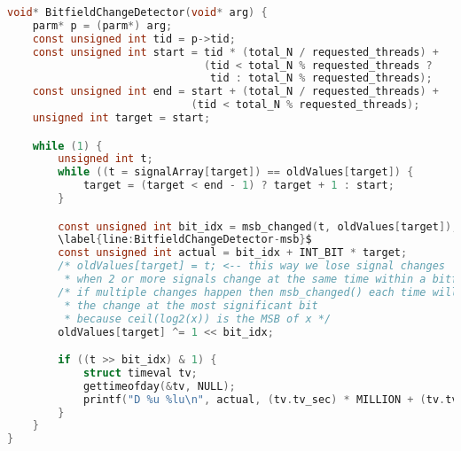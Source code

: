 \begin{lstlisting}[language=c, caption={BitfieldChangeDetector()}, escapechar=$]
void* BitfieldChangeDetector(void* arg) {
    parm* p = (parm*) arg;
    const unsigned int tid = p->tid;
    const unsigned int start = tid * (total_N / requested_threads) +
                               (tid < total_N % requested_threads ?
                                tid : total_N % requested_threads);
    const unsigned int end = start + (total_N / requested_threads) +
                             (tid < total_N % requested_threads);
    unsigned int target = start;

    while (1) {
        unsigned int t;
        while ((t = signalArray[target]) == oldValues[target]) {
            target = (target < end - 1) ? target + 1 : start;
        }

        const unsigned int bit_idx = msb_changed(t, oldValues[target]);$
        \label{line:BitfieldChangeDetector-msb}$
        const unsigned int actual = bit_idx + INT_BIT * target;
        /* oldValues[target] = t; <-- this way we lose signal changes
         * when 2 or more signals change at the same time within a bitfield. */
        /* if multiple changes happen then msb_changed() each time will find
         * the change at the most significant bit
         * because ceil(log2(x)) is the MSB of x */
        oldValues[target] ^= 1 << bit_idx;

        if ((t >> bit_idx) & 1) {
            struct timeval tv;
            gettimeofday(&tv, NULL);
            printf("D %u %lu\n", actual, (tv.tv_sec) * MILLION + (tv.tv_usec));
        }
    }
}
\end{lstlisting}

